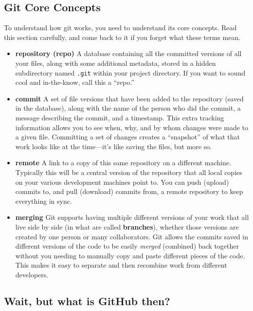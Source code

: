 \documentclass[]{book}
\theoremstyle{definition}
\theoremstyle{definition}
\theoremstyle{remark}
\begin{document}
\subsection{Git Core Concepts}\label{git-core-concepts}

To understand how git works, you need to understand its core concepts.
Read this section carefully, and come back to it if you forget what
these terms mean.

\begin{itemize}
\item
  \textbf{repository (repo)} A database containing all the committed
  versions of all your files, along with some additional metadata,
  stored in a hidden subdirectory named \texttt{.git} within your
  project directory. If you want to sound cool and in-the-know, call
  this a ``repo.''
\item
  \textbf{commit} A set of file versions that have been added to the
  repository (saved in the database), along with the name of the person
  who did the commit, a message describing the commit, and a timestamp.
  This extra tracking information allows you to see when, why, and by
  whom changes were made to a given file. Committing a set of changes
  creates a ``snapshot'' of what that work looks like at the time---it's
  like saving the files, but more so.
\item
  \textbf{remote} A link to a copy of this same repository on a
  different machine. Typically this will be a central version of the
  repository that all local copies on your various development machines
  point to. You can push (upload) commits to, and pull (download)
  commits from, a remote repository to keep everything in sync.
\item
  \textbf{merging} Git supports having multiple different versions of
  your work that all live side by side (in what are called
  \textbf{branches}), whether those versions are created by one person
  or many collaborators. Git allows the commits saved in different
  versions of the code to be easily \emph{merged} (combined) back
  together without you needing to manually copy and paste different
  pieces of the code. This makes it easy to separate and then recombine
  work from different developers.
\end{itemize}

\subsection{Wait, but what is GitHub
then?}\label{wait-but-what-is-github-then}
\end{document}
